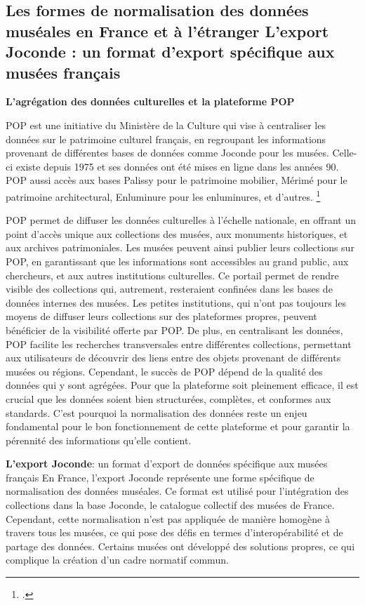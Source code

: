 \subsection{Les formes de normalisation des données muséales en France et à l’étranger
L’export Joconde : un format d'export spécifique aux musées français}

\textbf{L’agrégation des données culturelles et la plateforme POP}\newline

POP est une initiative du Ministère de la Culture qui vise à centraliser les données sur le patrimoine culturel français, en regroupant les informations provenant de différentes bases de données comme Joconde pour les musées. Celle-ci existe depuis 1975 et ses données ont été mises en ligne dans les années 90. POP aussi accès aux bases Palissy pour le patrimoine mobilier, Mérimé pour le patrimoine architectural, Enluminure pour les enluminures, et d’autres. \footcite{base_Joconde}

POP permet de diffuser les données culturelles à l’échelle nationale, en offrant un point d’accès unique aux collections des musées, aux monuments historiques, et aux archives patrimoniales. Les musées peuvent ainsi publier leurs collections sur POP, en garantissant que les informations sont accessibles au grand public, aux chercheurs, et aux autres institutions culturelles.
Ce portail permet de rendre visible des collections qui, autrement, resteraient confinées dans les bases de données internes des musées. Les petites institutions, qui n’ont pas toujours les moyens de diffuser leurs collections sur des plateformes propres, peuvent bénéficier de la visibilité offerte par POP. De plus, en centralisant les données, POP facilite les recherches transversales entre différentes collections, permettant aux utilisateurs de découvrir des liens entre des objets provenant de différents musées ou régions.
Cependant, le succès de POP dépend de la qualité des données qui y sont agrégées. Pour que la plateforme soit pleinement efficace, il est crucial que les données soient bien structurées, complètes, et conformes aux standards. C’est pourquoi la normalisation des données reste un enjeu fondamental pour le bon fonctionnement de cette plateforme et pour garantir la pérennité des informations qu’elle contient.
		

\textbf{L’export Joconde}: un format d'export de données spécifique aux musées français
En France, l’export Joconde représente une forme spécifique de normalisation des données muséales. Ce format est utilisé pour l’intégration des collections dans la base Joconde, le catalogue collectif des musées de France. Cependant, cette normalisation n’est pas appliquée de manière homogène à travers tous les musées, ce qui pose des défis en termes d’interopérabilité et de partage des données. Certains musées ont développé des solutions propres, ce qui complique la création d’un cadre normatif commun.\newline

